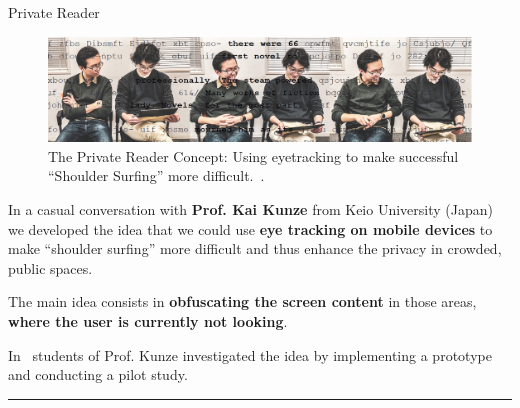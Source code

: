


\begin{frame}{Private Reader}

\vspace{1em}
\begin{figure}
\includegraphics[width=\linewidth]{side/shouldersurfing.jpg}

\vspace{-1em}
\caption{\scriptsize The Private Reader Concept: Using eyetracking to make 
successful ``Shoulder Surfing'' more difficult.~\cite{Ragozin2019}.}
\end{figure}

\justifying

In a casual conversation with {\bf Prof. Kai Kunze} from Keio University (Japan)
we developed the idea that we could use {\bf eye tracking on mobile devices} to 
make ``shoulder surfing'' more difficult and thus enhance the privacy in
crowded, public spaces.

\vspace{1em}
The main idea consists in {\bf obfuscating the screen content} in those areas, 
{\bf where the user is currently not looking}. 

\vspace{1em}
In~\cite{Ragozin2019} students of Prof. Kunze investigated the idea by 
implementing a prototype and conducting a pilot study.

\vspace{1em}

\begin{center}
\rule{2cm}{0.4pt}\\[0.5em]
\end{center}


\end{frame}
